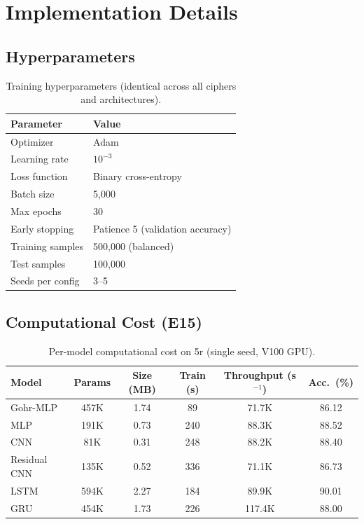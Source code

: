 \section{Implementation Details}
\label{sec:app-implementation}

\subsection{Hyperparameters}

\begin{table}[htbp]
\centering
\caption{Training hyperparameters (identical across all ciphers and architectures).}
\label{tab:hyperparams}
\begin{tabular}{@{}ll@{}}
\toprule
\textbf{Parameter} & \textbf{Value} \\
\midrule
Optimizer        & Adam \\
Learning rate    & $10^{-3}$ \\
Loss function    & Binary cross-entropy \\
Batch size       & 5,000 \\
Max epochs       & 30 \\
Early stopping   & Patience 5 (validation accuracy) \\
Training samples & 500,000 (balanced) \\
Test samples     & 100,000 \\
Seeds per config & 3--5 \\
\bottomrule
\end{tabular}
\end{table}

\subsection{Computational Cost (E15)}

\begin{table}[htbp]
\centering
\caption{Per-model computational cost on \speck 5r (single seed, V100 GPU).}
\label{tab:cost}
\begin{tabular}{@{}lccccc@{}}
\toprule
\textbf{Model} & \textbf{Params} & \textbf{Size (MB)} & \textbf{Train (s)} & \textbf{Throughput (s$^{-1}$)} & \textbf{Acc.\ (\%)} \\
\midrule
Gohr-MLP      & 457K  & 1.74 & 89   & 71.7K  & 86.12 \\
MLP           & 191K  & 0.73 & 240  & 88.3K  & 88.52 \\
CNN           & 81K   & 0.31 & 248  & 88.2K  & 88.40 \\
Residual CNN  & 135K  & 0.52 & 336  & 71.1K  & 86.73 \\
LSTM          & 594K  & 2.27 & 184  & 89.9K  & 90.01 \\
GRU           & 454K  & 1.73 & 226  & 117.4K & 88.00 \\
\bottomrule
\end{tabular}
\end{table}

